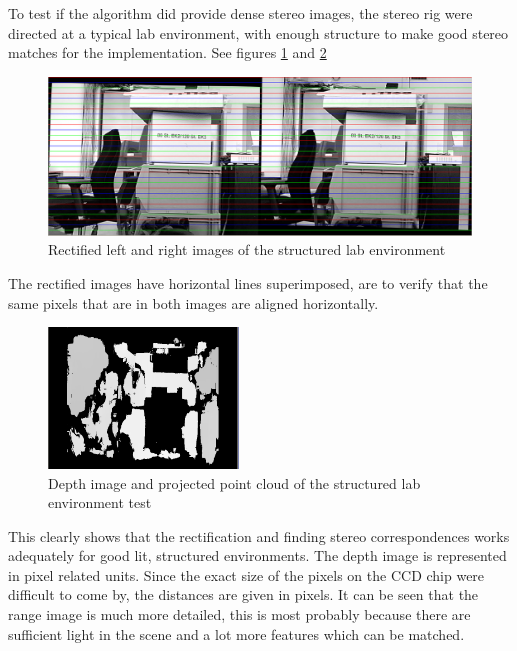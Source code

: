To test if the algorithm did provide dense stereo images, the stereo rig were directed at
a typical lab environment, with enough structure to make good stereo matches for the
implementation. See figures \ref{chap8:fig-structured-test-rectified} and
\ref{chap8:fig-structured-test-depth}
\begin{figure}[htbp]
    \centering
    \includegraphics[width=\textwidth]{pics/structure-test-rectified}
    \caption{Rectified left and right images of the structured lab environment}
    \label{chap8:fig-structured-test-rectified}
\end{figure}
The rectified images have horizontal lines superimposed, are to verify that the same
pixels that are in both images are aligned horizontally.
\begin{figure}[htbp]
    \centering
    \includegraphics[width=0.45\textwidth]{pics/structure-test-depth}
    \caption{Depth image and projected point cloud of the structured lab environment test}
    \label{chap8:fig-structured-test-depth}
\end{figure}
This clearly shows that the rectification and finding stereo correspondences
works adequately for good lit, structured
environments. The depth image is represented in pixel related units. Since the exact size
of the pixels on the CCD chip were difficult to come by, the distances are given in
pixels. It can be seen that the range image is much more detailed, this is most probably
because there are sufficient light in the scene and a lot more features which can be
matched.

